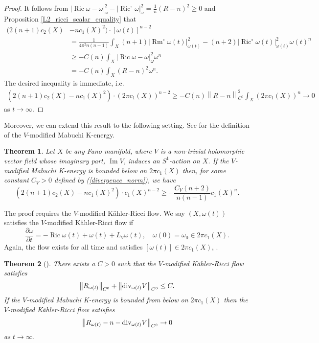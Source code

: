 \documentclass[12pt]{article}
\newtheorem{theorem}{Theorem}[section]
\numberwithin{equation}{section}
\renewcommand{\d}{\partial}
\DeclareMathOperator{\Ric}{Ric}
\DeclareMathOperator{\Rm}{Rm}
\DeclareMathOperator{\Imag}{Im}
\newcommand{\norm}[1]{\left\|#1\right\|}
\renewcommand{\div}{\textnormal{div}}
\begin{document}
\begin{proof}
It follows from $ |\Ric\omega - \omega|^2_{\omega} - |\Ric^\circ \omega|^2_{\omega} = \frac{1}{n}(R - n)^2 \geq 0$ and Proposition \ref{L2_ricci_scalar_equality} that
\begin{align*}
    \big(2(n+1)c_2(X) &- n c_1(X)^2\big) \cdot [\omega(t)]^{n-2}\\
    &= \frac{1}{4 \pi^2 n (n-1)}\int_X (n+1)|\Rm^\circ \omega(t)|^2_{\omega(t)} - (n+2)|\Ric^\circ \omega(t)|^2_{\omega(t)} \omega(t)^n\\
    &\geq -C(n) \int_X |\Ric\omega - \omega|^2_{\omega} \omega^n\\
    &= -C(n) \int_X (R-n)^2 \omega^n.
\end{align*}
\noindent The desired inequality is immediate, i.e.
\begin{align*}
    (2(n+1)c_2(X) - n c_1(X)^2) \cdot (2 \pi c_1(X))^{n-2} \geq -C(n) \norm{R - n}_{C^0}^2 \int_X (2 \pi c_1(X))^n  \to 0
\end{align*}
as $t \to \infty$. 
\end{proof}

\noindent Moreover, we can extend this result to the following setting. See \cite{TZ02,PSSW11} for the definition of the $V$-modified Mabuchi K-energy.

\begin{theorem}\label{modified_fano_MY}
Let $X$ be any Fano manifold, where $V$ is a non-trivial holomorphic vector field whose imaginary
part, $\Imag V$, induces an $S^1$-action on $X$. If the $V$-modified Mabuchi K-energy is bounded below on $2 \pi c_1(X)$ then, for some constant $C_V > 0$ defined by (\ref{divergence_norm}), we have
\begin{equation*}
    (2(n+1) c_2(X) - n c_1(X)^2) \cdot  c_1(X)^{n-2} \geq -\frac{C_V(n+2)}{n(n-1)} c_1(X)^n.
\end{equation*}
\end{theorem}

\noindent The proof requires the $V$-modified K\"ahler-Ricci flow. We say $(X,\omega(t))$ satisfies the $V$-modified K\"ahler-Ricci flow if
\begin{equation*}
    \frac{\d\omega}{\d t} = -\Ric \omega(t) + \omega(t) + L_{V} \omega(t), \quad \omega(0) = \omega_0 \in 2 \pi c_1(X).
\end{equation*}
Again, the flow exists for all time and satisfies $[\omega(t)] \in 2 \pi c_1(X)$, \cite{PSSW11}.\\

\begin{theorem}[\cite{PSSW11}]\label{scalar_and_div_bounds}
There exists a $C > 0$ such that the $V$-modified K\"ahler-Ricci flow satisfies
\begin{equation*}
    \norm{R_{\omega(t)}}_{C^0} + \norm{\div_{\omega(t)} V}_{C^0} \leq C.
\end{equation*}
If the $V$-modified Mabuchi K-energy is bounded from below on $2\pi c_1(X)$ then the $V$-modified K\"ahler-Ricci flow satisfies
\begin{equation*}
    \norm{R_{\omega(t)} - n - \div_{\omega(t)} V}_{C^0} \to 0
\end{equation*}
as $t \to \infty$.
\end{theorem}
\end{document}
